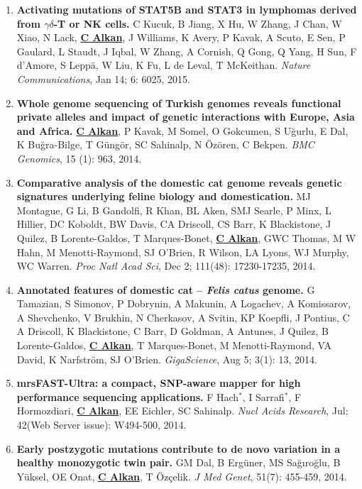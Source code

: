 \begin{enumerate}
  \item        
  {\bf Activating mutations of STAT5B and STAT3 in lymphomas derived from $\gamma\delta$-T or NK cells.}
   C Kucuk, B Jiang, X Hu, W Zhang, J Chan, W Xiao, N Lack,   {\bf {\underline {C Alkan}}},  J Williams, K Avery, P Kavak, A Scuto, E Sen,  P Gaulard, L Staudt, J Iqbal,  W Zhang,  A Cornish, Q Gong, Q  Yang, H Sun, F d'Amore, S Leppä, W Liu, K Fu, L de Leval, T McKeithan.
 {\em Nature Communications}, Jan 14; 6: 6025, 2015.


\clearpage
  \item        
  {\bf Whole genome sequencing of Turkish genomes reveals functional private alleles and impact of genetic interactions with Europe, Asia and Africa.}
  {\bf {\underline {C Alkan}}}, P Kavak, M Somel, O Gokcumen, S Uğurlu, E Dal, K Buğra-Bilge,  T Güngör, SC Sahinalp, N Özören, C Bekpen.
  {\em BMC Genomics}, 15 (1): 963, 2014.


  \item        
  {\bf Comparative analysis of the domestic cat genome reveals genetic signatures underlying feline biology and domestication.}
  MJ Montague, G Li, B Gandolfi, R Khan, BL Aken, SMJ Searle, P Minx, L Hillier, DC Koboldt, BW Davis, CA Driscoll, 
  CS Barr, K Blackistone, J Quilez, B Lorente-Galdos, T Marques-Bonet, {\bf {\underline {C Alkan}}}, GWC Thomas, M W Hahn, M Menotti-Raymond, 
  SJ O’Brien, R Wilson, LA Lyons, WJ Murphy, WC Warren. {\em Proc Natl Acad Sci}, Dec 2; 111(48): 17230-17235, 2014.

  \item        
  {\bf Annotated features of domestic cat – \textit{Felis catus} genome.}
  G Tamazian, S Simonov, P Dobrynin, A Makunin, A Logachev, 
  A Komissarov, A Shevchenko, V Brukhin, N Cherkasov, A Svitin,
  KP Koepfli, J Pontius, C A Driscoll, K Blackistone, C Barr, 
  D Goldman, A Antunes, J Quilez, B Lorente-Galdos,  {\bf {\underline {C Alkan}}},
  T Marques-Bonet, M Menotti-Raymond, VA David, K Narfström, SJ O’Brien.
  {\em GigaScience}, Aug 5;  3(1): 13, 2014.
       
       
       
  \item        
  {\bf mrsFAST-Ultra: a compact, SNP-aware mapper for high performance sequencing applications.}
    F Hach$^*$,
    I Sarrafi$^*$,
    F Hormozdiari,
    {\bf {\underline {C Alkan}}},
    EE Eichler,   SC Sahinalp.
    {\em Nucl Acids Research}, Jul; 42(Web Server issue): W494-500, 2014.

  \item        
         {\bf Early postzygotic mutations contribute to de novo variation in a healthy monozygotic twin pair.}
         GM Dal, B Ergüner, MS Sağıroğlu, B Yüksel, OE Onat, {\bf {\underline {C Alkan}}}, T Özçelik. 
         {\em J Med Genet}, 51(7): 455-459, 2014.


\end{enumerate}
